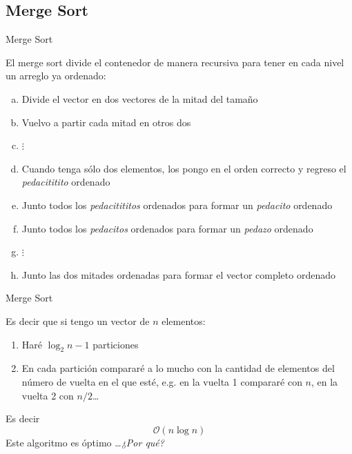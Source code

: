 \documentclass[spanish, c]{beamer}
\newcommand{\bigO}{\mathcal{O}}
\begin{document}
\subsection{Merge Sort}

\begin{frame}{Merge Sort}
    
    El \alert{merge sort} divide el contenedor de manera recursiva para tener en cada nivel un arreglo ya ordenado:

    \begin{enumerate}[a)]
        \item Divide el vector en dos vectores de la mitad del tamaño \pause
        \item Vuelvo a partir cada mitad en otros dos\pause
        \item $\vdots$
        \item Cuando tenga sólo dos elementos, los pongo en el orden correcto y regreso el \textit{pedacititito} ordenado \pause
        \item Junto todos los \textit{pedacitititos} ordenados para formar un \textit{pedacito} ordenado \pause
        \item Junto todos los \textit{pedacitos} ordenados para formar un \textit{pedazo} ordenado \pause
        \item $\vdots$ 
        \item Junto las dos mitades ordenadas para formar el vector completo ordenado
    \end{enumerate}
\end{frame}

\begin{frame}{Merge Sort}

    Es decir que si tengo un vector de $n$ elementos: \pause

    \begin{enumerate}[1)]
        \item Haré $\log_2 n - 1$ particiones \pause
        \item En cada partición compararé a lo mucho con la cantidad de elementos del número de vuelta en el que esté, e.g. en la vuelta 1 compararé con $n$, en la vuelta 2 con $n/2$\dots \pause
    \end{enumerate}

    \bigskip

    Es decir
    {\Large $$\bigO(n\log n)$$}
    Este algoritmo es \alert{óptimo} \dots \pause \textit{¿Por qué?}

\end{frame}
\end{document}
